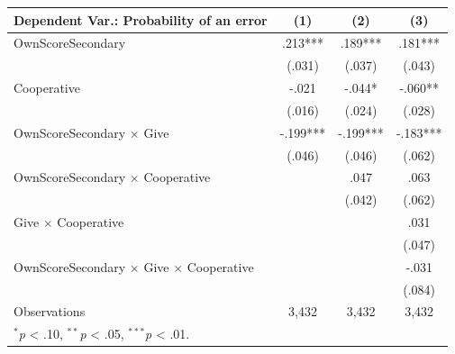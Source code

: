 \begingroup
\centering
\begin{tabular*}{\linewidth}{@{\extracolsep{\fill}}lccc}
   \toprule
   Dependent Var.: Probability of an error & \multicolumn{1}{c}{(1)} & \multicolumn{1}{c}{(2)} & \multicolumn{1}{c}{(3)}\\
   \midrule
   OwnScoreSecondary & \mbox{\hphantom{8}.213***} & \mbox{\hphantom{8}.189***} & \mbox{\hphantom{8}.181***}\\
    & \mbox{(.031)\hphantom{88}} & \mbox{(.037)\hphantom{88}} & \mbox{(.043)\hphantom{88}}\\
   Cooperative & \mbox{-.021\hphantom{888}} & \mbox{-.044*\hphantom{88}} & \mbox{-.060**\hphantom{8}}\\
    & \mbox{(.016)\hphantom{88}} & \mbox{(.024)\hphantom{88}} & \mbox{(.028)\hphantom{88}}\\
   OwnScoreSecondary $\times$ Give & \mbox{-.199***} & \mbox{-.199***} & \mbox{-.183***}\\
    & \mbox{(.046)\hphantom{88}} & \mbox{(.046)\hphantom{88}} & \mbox{(.062)\hphantom{88}}\\
   OwnScoreSecondary $\times$ Cooperative &  & \mbox{\hphantom{8}.047\hphantom{888}} & \mbox{\hphantom{8}.063\hphantom{888}}\\
    &  & \mbox{(.042)\hphantom{88}} & \mbox{(.062)\hphantom{88}}\\
   Give $\times$ Cooperative &  &  & \mbox{\hphantom{8}.031\hphantom{888}}\\
    &  &  & \mbox{(.047)\hphantom{88}}\\
   OwnScoreSecondary $\times$ Give $\times$ Cooperative &  &  & \mbox{-.031\hphantom{888}}\\
    &  &  & \mbox{(.084)\hphantom{88}}\\
   \midrule
   Observations & 3,432 & 3,432 & 3,432\\
   \multicolumn{4}{l}{\footnotesize $^{*}$\textit{p} < .10, $^{**}$\textit{p} < .05, $^{***}$\textit{p} < .01.}\\
   \bottomrule
\end{tabular*}
\par\endgroup
